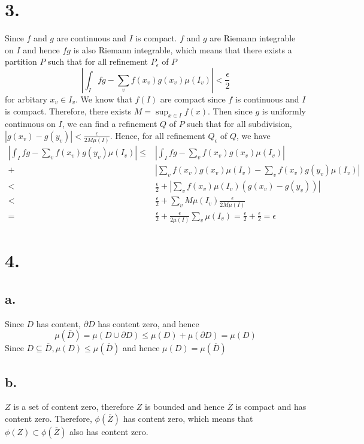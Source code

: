 \documentclass[11pt]{article}
\begin{document}
\section*{3.}
Since $f$ and $g$ are continuous and $I$ is compact. $f$ and $g$ are Riemann integrable on $I$ and 
hence $fg$ is also Riemann integrable, which means that there exists a partition $P$ such that 
for all refinement $P_\epsilon$ of $P$
\[
    \left| \int_I fg - \sum_v f(x_v) g(x_v) \mu(I_v)\right| < \frac{\epsilon}{2} 
\]
for arbitary $x_v \in I_v$. We know that $f(I)$ are compact 
since $f$ is continuous and $I$ is compact. 
Therefore, there exists $M = \sup_{x \in I}f(x)$.
Then since $g$ is uniformly continuous on $I$, we can find a refinement $Q$ of $P$ such that 
for all subdivision, $|g(x_v) - g(y_v)| < \frac{\epsilon}{2 M \mu(I)}$. 
Hence, for all refinement $Q_\epsilon$ of $Q$, we have 
\begin{equation*}
    \begin{aligned}
        \left| \int_I fg - \sum_v f(x_v) g(y_v) \mu(I_v) \right| 
        \le & \left| \int_I fg - \sum_v f(x_v) g(x_v) \mu(I_v) \right| \\
         +& \left| \sum_v f(x_v) g(x_v) \mu(I_v) - \sum_v f(x_v) g(y_v) \mu(I_v) \right| \\
        < & \frac{\epsilon}{2} 
        + \left| \sum_v f(x_v) \mu(I_v) (g(x_v) - g(y_v) )\right| \\
        < & \frac{\epsilon}{2} + \sum_v M \mu(I_v) \frac{\epsilon}{2 M \mu(I)}  \\
        = & \frac{\epsilon}{2} + \frac{\epsilon}{2 \mu(I)} \sum_v \mu(I_v) 
        = \frac{\epsilon}{2} + \frac{\epsilon}{2} = \epsilon
    \end{aligned}
\end{equation*}
\pagebreak
\section*{4.}
\subsection*{a.}
Since $D$ has content, $\partial D$ has content zero, and hence
\[
    \mu(\overline{D}) = \mu(D \cup \partial D) \le \mu(D) + \mu(\partial D) = \mu(D)    
\]
Since $D \subseteq \overline{D}, \mu(D) \le \mu(\overline{D})$ and hence $\mu(D) = \mu(\overline{D})$
\subsection*{b.}
$Z$ is a set of content zero, therefore $Z$ is bounded and 
hence $\overline{Z}$ is compact and has content zero. 
Therefore, $\phi(\overline{Z})$ has content zero, which means that $\phi(Z) \subset \phi(\overline{Z})$ also has content zero.
\pagebreak
\end{document}
